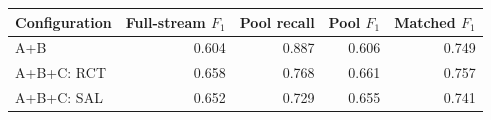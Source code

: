 \begin{tabular}{@{}lrrrr@{}}
\toprule
Configuration & Full-stream $F_1$ & Pool recall & Pool $F_1$ & Matched $F_1$ \\
\midrule
A+B & 0.604 & 0.887 & 0.606 & 0.749 \\
A+B+C: RCT & 0.658 & 0.768 & 0.661 & 0.757 \\
A+B+C: SAL & 0.652 & 0.729 & 0.655 & 0.741 \\
\bottomrule
\end{tabular}
